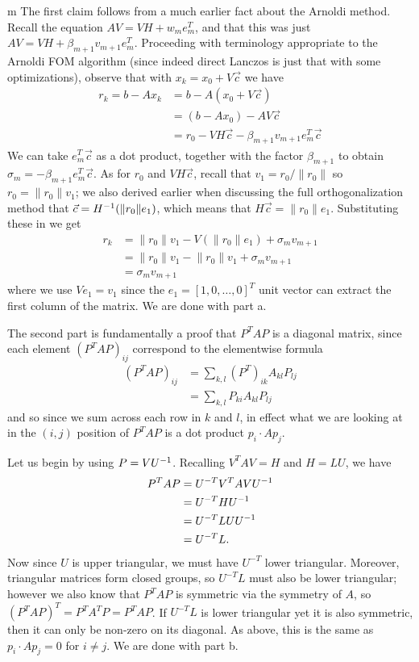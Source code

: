 \documentclass[11pt]{article}
\begin{document}
\begin{my proof}{m}
The first claim follows from a much earlier fact about the Arnoldi method. Recall the equation $AV = VH + w_{m} e_m^T$, and that this was just $AV = VH + \beta_{m+1} v_{m+1} e_m^T$. Proceeding with terminology appropriate to the Arnoldi FOM algorithm (since indeed direct Lanczos is just that with some optimizations), observe that with $x_k = x_0 + V \vec c$ we have \begin{align*}
r_k = b - Ax_k &= b - A(x_0 + V \vec c) \\&= (b - Ax_0) - AV\vec c \\&= r_0 - VH\vec c - \beta_{m+1} v_{m+1}e_m^T \vec c
\end{align*}
We can take $e_m^T \vec c$ as a dot product, together with the factor $\beta_{m+1}$ to obtain $\sigma_m = - \beta_{m+1} e_m^T \vec c$. As for $r_0$ and $VH \vec c$, recall that $v_1 = r_0 / \lVert r_0 \rVert $ so $r_0 = \lVert r_0 \rVert v_1$; we also derived earlier when discussing the full orthogonalization method that $\vec c= H^{-1} (\lVert r_0 \rVert e_1)$, which means that $H \vec c= \lVert r_0 \rVert e_1$. Substituting these in we get \begin{align*}
r_k &= \lVert r_0 \rVert v_1 - V(\lVert r_0 \rVert e_1) + \sigma_m v_{m+1} \\
&= \lVert r_0 \rVert v_1 - \lVert r_0 \rVert v_1 + \sigma_m v_{m+1} \\
&= \sigma_m v_{m+1}
\end{align*}
where we use $V e_1 = v_1$ since the $e_1 = [1,0,\dots,0]^T $ unit vector can extract the first column of the matrix. We are done with part a.

The second part is fundamentally a proof that $P^T A P$ is a diagonal matrix, since each element $(P^T A P)_{ij}$ correspond to the elementwise formula \begin{align*}
(P^T A P)_{ij} &= \sum_{k,l} (P^T)_{ik} A_{kl} P_{lj} \\
&= \sum_{k,l} P_{ki} A_{kl} P_{lj}
\end{align*}
and so since we sum across each row in $k$ and $l$, in effect what we are looking at in the $(i,j)$ position of $P^T A P$ is a dot product $p_i \cdot A p_j$.

Let us begin by using $P = VU^{-1}$. Recalling $V^T A V = H$ and $H = LU$, we have \begin{align*}
P^T A P &= U^{-T} V^T A V U^{-1} \\
&= U^{-T} H U^{-1} \\
&= U^{-T} LU U^{-1} \\
&= U^{-T} L.
\end{align*}
Now since $U$ is upper triangular, we must have $U^{-T}$ lower triangular. Moreover, triangular matrices form closed groups, so $U^{-T} L$ must also be lower triangular; however we also know that $P^T A P$ is symmetric via the symmetry of $A$, so $(P^T A P)^T = P^T A^T P = P^T A P$. If $U^{-T}L$ is lower triangular yet it is also symmetric, then it can only be non-zero on its diagonal. As above, this is the same as $p_i \cdot A p_j = 0$ for $i \neq j$. We are done with part b.
\end{my proof}
\end{document}
